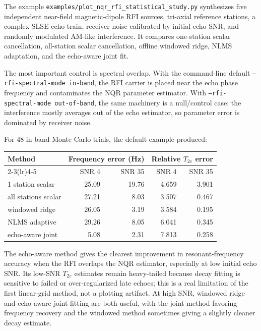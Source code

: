 \documentclass[11pt,oneside]{report}
\newcommand{\code}[1]{\texttt{#1}}
\begin{document}
The example
\code{examples/plot\_nqr\_rfi\_statistical\_study.py} synthesizes five
independent near-field magnetic-dipole RFI sources, tri-axial reference
stations, a complex SLSE echo train, receiver noise calibrated by initial echo
SNR, and randomly modulated AM-like interference. It compares one-station
scalar cancellation, all-station scalar cancellation, offline windowed ridge,
NLMS adaptation, and the echo-aware joint fit.

The most important control is spectral overlap. With the command-line default
\code{--rfi-spectral-mode in-band}, the RFI carrier is placed near the echo
phase frequency and contaminates the NQR parameter estimator. With
\code{--rfi-spectral-mode out-of-band}, the same machinery is a null/control
case: the interference mostly averages out of the echo estimator, so parameter
error is dominated by receiver noise.

For 48 in-band Monte Carlo trials, the default example produced:

\begin{center}
\begin{tabular}{lrrrr}
\toprule
Method & \multicolumn{2}{c}{Frequency error (Hz)} &
\multicolumn{2}{c}{Relative \(T_{2e}\) error} \\
\cmidrule(lr){2-3}\cmidrule(lr){4-5}
& SNR 4 & SNR 35 & SNR 4 & SNR 35 \\
\midrule
1 station scalar & 25.09 & 19.76 & 4.659 & 3.901 \\
all stations scalar & 27.21 & 8.03 & 3.507 & 0.467 \\
windowed ridge & 26.05 & 3.19 & 3.584 & 0.195 \\
NLMS adaptive & 29.26 & 8.05 & 6.041 & 0.345 \\
echo-aware joint & 5.08 & 2.31 & 7.813 & 0.258 \\
\bottomrule
\end{tabular}
\end{center}

The echo-aware method gives the clearest improvement in resonant-frequency
accuracy when the RFI overlaps the NQR estimator, especially at low initial
echo SNR. Its low-SNR \(T_{2e}\) estimates remain heavy-tailed because decay
fitting is sensitive to failed or over-regularized late echoes; this is a real
limitation of the first linear-grid method, not a plotting artifact. At high
SNR, windowed ridge and echo-aware joint fitting are both useful, with the joint
method favoring frequency recovery and the windowed method sometimes giving a
slightly cleaner decay estimate.
\end{document}
